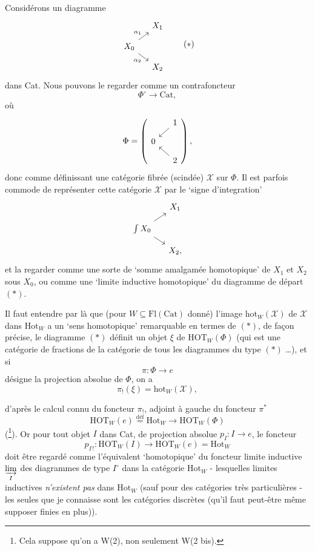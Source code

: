 \documentclass[11pt]{article}
\newcommand{\printedpage}[1]{\marginpar{\footnotesize p.~#1}}
\newcommand{\msp}[1]{\marginpar{\footnotesize [#1]}}
\newcommand{\Hot}{\mathrm{Hot}}
\newcommand{\HOT}{\mathrm{HOT}}
\begin{document}
Considérons un diagramme
\[
\begin{tikzcd}[row sep=small, column sep=small]
& X_1 \\
X_0 \arrow[ur, "\alpha_1"] \arrow[dr, "\alpha_2"'] & \\
& X_2
\end{tikzcd}
\tag*{$(*)$}
\]
dans Cat. Nous pouvons le regarder comme un contrafoncteur
\[
\Phi^\circ \longrightarrow \mathrm{Cat},
\]
où
\[
\Phi = \left( \vcenter{\hbox{\begin{tikzcd}[row sep=small, column sep=small]
& 1 \arrow[dl] \\
0 & \\
& 2 \arrow[ul]
\end{tikzcd}}} \right),
\]
donc comme définissant une catégorie fibrée (scindée) $\mathscr{X}$ sur $\Phi$. Il est parfois commode de représenter cette catégorie $\mathscr{X}$ par le ‘signe d'integration’ %
\[
\begin{tikzcd}[row sep=small, column sep=small]
& X_1 \\
\int X_0 \arrow[ur] \arrow[dr] & \\
& X_2,
\end{tikzcd}
\]
et la regarder comme une sorte de ‘somme amalgamée homotopique’ de $X_1$ et $X_2$ sous $X_0$, ou comme une ‘limite inductive homotopique’ du diagramme de départ $(*)$.

\msp{page 122}
Il faut entendre par là que (pour $W \subseteq \mathrm{Fl}(\mathrm{Cat})$ donné) l'image $\mathrm{hot}_W(\mathscr{X})$ de $\mathscr{X}$ dans $\mathrm{Hot}_W$ a un ‘sens homotopique’ remarquable en termes de $(*)$, de façon précise, le diagramme $(*)$ définit un objet $\xi$ de $\mathrm{HOT}_W(\Phi)$ (qui est une catégorie de fractions de la catégorie de tous les diagrammes du type $(*)$ \dots), et si
\[
\pi : \Phi \longrightarrow e
\]
désigne la projection absolue de $\Phi$, on a
\[
\pi_!(\xi) = \mathrm{hot}_W(\mathscr{X}),
\]

\printedpage{83}
d'après le calcul connu du foncteur $\pi_!$, adjoint à gauche du foncteur $\pi^*$
\[
\HOT_W(e) \overset{\text{déf}}{=} \Hot_W \longrightarrow \HOT_W(\Phi)
\]
(\footnote[84]{Cela suppose qu'on a W(2), non seulement W(2 bis).}). Or pour tout objet $I$ dans Cat, de projection absolue $p_I : I \longrightarrow e$, le foncteur
\[
p_{I\,!} : \HOT_W(I) \longrightarrow \HOT_W(e) = \Hot_W
\]
doit être regardé comme l'équivalent `homotopique' du foncteur limite inductive $\varinjlim\limits_{I}$ des diagrammes de type $I^{\circ}$ dans la catégorie $\Hot_W$ - lesquelles limites inductives \textit{n'existent pas} dans $\Hot_W$ (sauf
\msp{page 123}
pour des catégories très particulières - les seules que je connaisse sont les catégories discrètes (qu'il faut peut-être même supposer finies en plus)).
\end{document}
